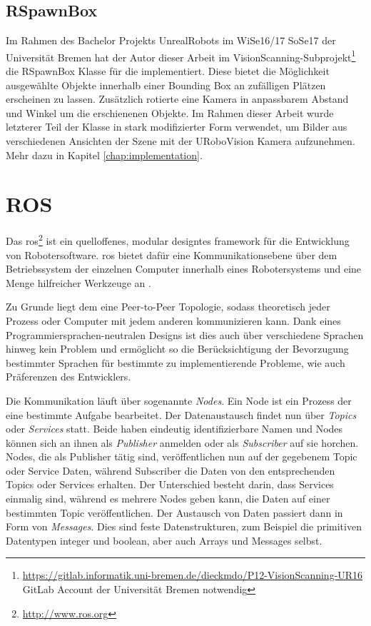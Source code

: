 \subsection{RSpawnBox}
\label{sec:rspawnbox}

Im Rahmen des Bachelor Projekts UnrealRobots im WiSe16/17 SoSe17 der Universität Bremen hat der Autor dieser Arbeit im VisionScanning-Subprojekt\footnote{\url{https://gitlab.informatik.uni-bremen.de/dieckmdo/P12-VisionScanning-UR16} GitLab Account der Universität Bremen notwendig} die RSpawnBox Klasse für die \unreal implementiert. Diese bietet die Möglichkeit ausgewählte Objekte innerhalb einer Bounding Box an zufälligen Plätzen erscheinen zu lassen. Zusätzlich rotierte eine Kamera in anpassbarem Abstand und Winkel um die erschienenen Objekte. Im Rahmen dieser Arbeit wurde letzterer Teil der Klasse in stark modifizierter Form verwendet, um Bilder aus verschiedenen Ansichten der Szene mit der URoboVision Kamera aufzunehmen. Mehr dazu in Kapitel \ref{chap:implementation}.         

\section{ROS}
\label{sec:ros}
Das \acrfull{ros}\footnote{\url{http://www.ros.org}} ist ein quelloffenes, modular designtes \gls{framework} für die Entwicklung von Robotersoftware. \gls{ros} bietet dafür eine Kommunikationsebene über dem Betriebssystem der einzelnen Computer innerhalb eines Robotersystems und eine Menge hilfreicher Werkzeuge an \cite{ros}.\par 

Zu Grunde liegt dem eine Peer-to-Peer Topologie, sodass theoretisch jeder Prozess oder Computer mit jedem anderen kommunizieren kann. Dank eines Programmiersprachen-neutralen Designs ist dies auch über verschiedene Sprachen hinweg kein Problem und ermöglicht so die Berücksichtigung der Bevorzugung bestimmter Sprachen für bestimmte zu implementierende Probleme, wie auch Präferenzen des Entwicklers.\par

Die Kommunikation läuft über sogenannte \textit{Nodes}. Ein Node ist ein Prozess der eine bestimmte Aufgabe bearbeitet. Der Datenaustausch findet nun über \textit{Topics} oder \textit{Services} statt. Beide haben eindeutig identifizierbare Namen und Nodes können sich an ihnen als \textit{Publisher} anmelden oder als \textit{Subscriber} auf sie horchen. Nodes, die als Publisher tätig sind, veröffentlichen nun auf der gegebenem Topic oder Service Daten, während Subscriber die Daten von den entsprechenden Topics oder Services erhalten. Der Unterschied besteht darin, dass Services einmalig sind, während es mehrere Nodes geben kann, die Daten auf einer bestimmten Topic veröffentlichen. Der Austausch von Daten passiert dann in Form von \textit{Messages}. Dies sind feste Datenstrukturen, zum Beispiel die primitiven Datentypen integer und boolean, aber auch Arrays und Messages selbst. \par

